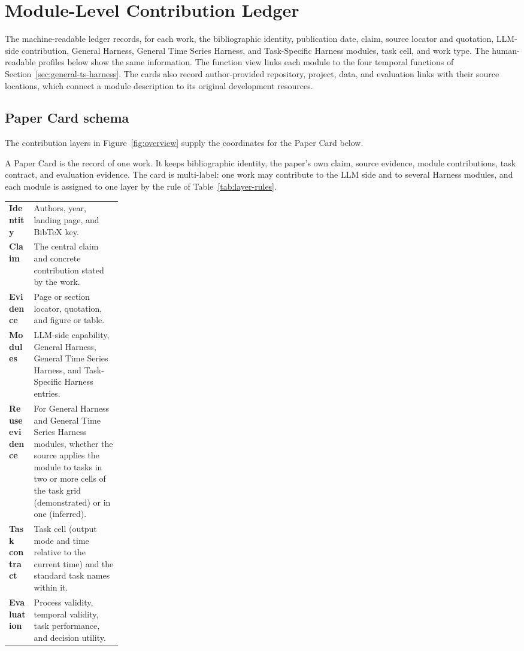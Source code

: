 \documentclass[preprints,article,submit,moreauthors]{Definitions/mdpi}
\begin{document}


\clearpage


\appendixstart
\appendix
\section{Module-Level Contribution Ledger}
\label{app:full-ledger}
The machine-readable ledger records, for each work, the bibliographic identity, publication date, claim, source locator and quotation, LLM-side contribution, General Harness, General Time Series Harness, and Task-Specific Harness modules, task cell, and work type. The human-readable profiles below show the same information. The function view links each module to the four temporal functions of Section~\ref{sec:general-ts-harness}. The cards also record author-provided repository, project, data, and evaluation links with their source locations, which connect a module description to its original development resources.

\subsection{Paper Card schema}

The contribution layers in Figure~\ref{fig:overview} supply the coordinates for the Paper Card below.

\label{app:paper-card}
A Paper Card is the record of one work. It keeps bibliographic identity, the paper's own claim, source evidence, module contributions, task contract, and evaluation evidence. The card is multi-label: one work may contribute to the LLM side and to several Harness modules, and each module is assigned to one layer by the rule of Table~\ref{tab:layer-rules}.

\begin{tcolorbox}[
  colback=surveyCard,
  colframe=surveyBlue!55!black,
  boxrule=0.8pt,
  arc=5pt,
  left=10pt,
  right=10pt,
  top=8pt,
  bottom=8pt,
  title=\textbf{Paper Card fields},
  fonttitle=\sffamily\bfseries,
  coltitle=white
]
\small
\begin{tabularx}{\linewidth}{@{}>{\sffamily\bfseries}p{0.22\linewidth}X@{}}
Identity & Authors, year, landing page, and BibTeX key.\\
Claim & The central claim and concrete contribution stated by the work.\\
Evidence & Page or section locator, quotation, and figure or table.\\
Modules & LLM-side capability, General Harness, General Time Series Harness, and Task-Specific Harness entries.\\
Reuse evidence & For General Harness and General Time Series Harness modules, whether the source applies the module to tasks in two or more cells of the task grid (demonstrated) or in one (inferred).\\
Task contract & Task cell (output mode and time relative to the current time) and the standard task names within it.\\
Evaluation & Process validity, temporal validity, task performance, and decision utility.
\end{tabularx}
\end{tcolorbox}
\end{document}
